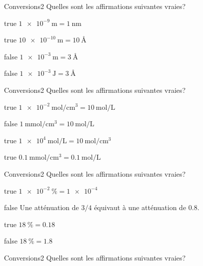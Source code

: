         \begin{question}{}{Conversions}{2}{}
            Quelles sont les affirmations suivantes vraies?
        \end{question}
        \begin{reponses}
            \item[true] $\SI{1e-9}{\meter} = \SI{1}{\nano\meter}$
            \item[true] $\SI{10e-10}{\meter} = \SI{10}{\angstrom}$
            \item[false] $\SI{1e-3}{\meter} = \SI{3}{\angstrom}$
            \item[false] $\SI{1e-3}{\joule} = \SI{3}{\angstrom}$
        \end{reponses}
		\begin{question}{}{Conversions}{2}{}
            Quelles sont les affirmations suivantes vraies?
        \end{question}
        \begin{reponses}
            \item[true] $\SI{1e-2}{\mole\per\centi\meter\cubed} = \SI{10}{\mole\per\liter}$
            \item[false] $\SI{1}{\milli\mole\per\centi\meter\cubed} = \SI{10}{\mole\per\liter}$
            \item[true] $\SI{1e4}{\mole\per\liter} = \SI{10}{\mole\per\centi\meter\cubed}$
            \item[true] $\SI{0.1}{\milli\mole\per\centi\meter\cubed} = \SI{0.1}{\mole\per\liter}$
        \end{reponses}
        \begin{question}{}{Conversions}{2}{}
            Quelles sont les affirmations suivantes vraies?
        \end{question}
        \begin{reponses}
            \item[true] $\SI{1e-2}{\percent} = \num{1e-4}$
            \item[false] Une atténuation de $3/4$ équivaut à une atténuation de \num{.8}.
            \item[true] $\SI{18}{\percent} = \num{0.18}$
            \item[false] $\SI{18}{\percent} = \num{1.8}$
        \end{reponses}
         \begin{question}{}{Conversions}{2}{}
            Quelles sont les affirmations suivantes vraies?
        \end{question}
